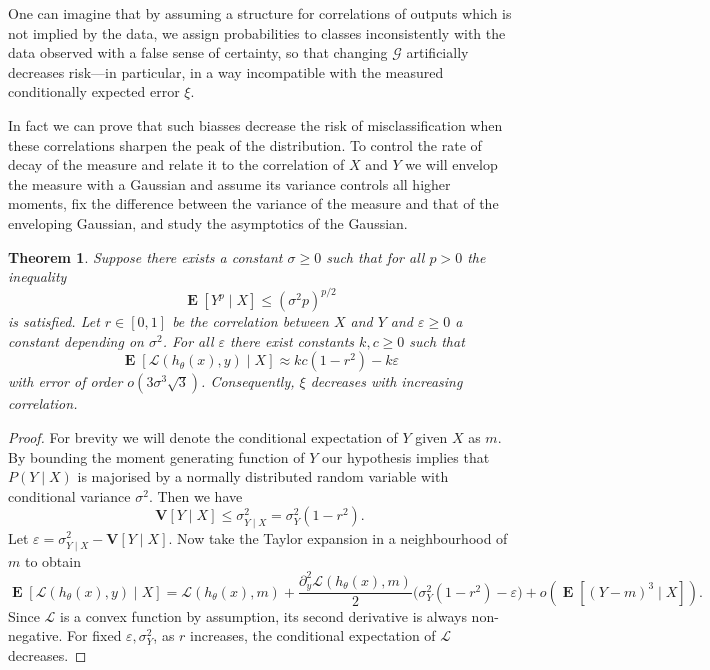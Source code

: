 \documentclass[11pt]{amsart}
\numberwithin{equation}{section}
\newtheorem{theorem}{Theorem}[section]
\theoremstyle{remark}
\theoremstyle{remark}
\DeclareMathOperator{\E}{\mathbf{E}}
\newcommand{\lag}{\mathcal{L}}
\newcommand{\G}{\mathcal{G}}
\newcommand{\eps}{\varepsilon}
\newcommand{\V}{\mathbf{V}}
\begin{document}
One can imagine that by assuming a structure for correlations of outputs which is not implied by the data, we assign probabilities to classes inconsistently with the data observed with a false sense of certainty, so that changing $\G$ artificially decreases risk---in particular, in a way incompatible with the measured conditionally expected error $\xi$.

In fact we can prove that such biasses decrease the risk of misclassification when these correlations sharpen the peak of the distribution. To control the rate of decay of the measure and relate it to the correlation of $X$ and $Y$ we will envelop the measure with a Gaussian and assume its variance controls all higher moments, fix the difference between the variance of the measure and that of the enveloping Gaussian, and study the asymptotics of the Gaussian.

\begin{theorem}\label{legendary-bound-thm}
    Suppose there exists a constant $\sigma \geqslant 0$ such that for all $p > 0$ the inequality 
    \[
        \E[Y^p \mid X] \leqslant \left(\sigma^2 p\right)^{p/2}
    \]
    is satisfied. Let $r \in [0,1]$ be the correlation between $X$ and $Y$ and $\eps \geqslant 0$ a constant depending on $\sigma^2$. For all $\eps$ there exist constants $k, c \geqslant 0$ such that 
    \[
        \E[\lag(h_\theta(x), y) \mid X] \approx kc(1 - r^2) - k\eps
    \]
    with error of order $o\!\left(3\sigma^3\sqrt{3}\right)$. Consequently, $\xi$ decreases with increasing correlation.
\end{theorem}
\begin{proof}
    For brevity we will denote the conditional expectation of $Y$ given $X$ as $m$. By bounding the moment generating function of $Y$ our hypothesis implies that $P(Y \mid X)$ is majorised by a normally distributed random variable with conditional variance $\sigma^2$. Then we have 
    \[
        \V[Y \mid X] \leqslant \sigma^2_{Y \mid X} = \sigma^2_Y(1-r^2).
    \]
    Let $\eps = \sigma^2_{Y\mid X} - \V[Y \mid X]$. Now take the Taylor expansion in a neighbourhood of $m$ to obtain
    \[
        \E[\lag(h_\theta(x), y) \mid X] = \lag(h_\theta(x), m) + \frac{\partial_{y}^2 \lag(h_\theta(x), m)}{2} \big(\sigma^2_Y(1-r^2) - \eps\big) + o(\E[(Y - m)^3 \mid X]).
    \]
    Since $\lag$ is a convex function by assumption, its second derivative is always non-negative. For fixed $\eps, \sigma^2_Y$, as $r$ increases, the conditional expectation of $\lag$ decreases.
\end{proof}    
\end{document}
